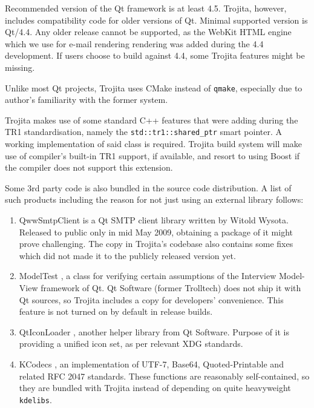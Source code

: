 \documentclass[12pt,notitlepage]{report}
\newcommand{\trojita}{Trojita\xspace}
\begin{document}
Recommended version of the Qt framework \cite{qt} is at least 4.5. \trojita,
however, includes compatibility code for older versions of Qt. Minimal supported
version is Qt/4.4. Any older release cannot be supported, as the WebKit HTML
engine which we use for e-mail rendering rendering was added during the 4.4
development. If users choose to build against 4.4, some \trojita features might
be missing.

Unlike most Qt projects, \trojita uses CMake \cite{cmake} instead of {\tt qmake},
especially due to author's familiarity with the former system.

\trojita makes use of some standard C++ features that were adding during the TR1
\cite{std-tr1} standardisation, namely the {\tt std::tr1::shared\_ptr} smart
pointer. A working implementation of said class is required.  \trojita build
system will make use of compiler's built-in TR1 support, if available, and
resort to using Boost if the compiler does not support this extension.

Some 3rd party code is also bundled in the source code distribution.  A list of
such products including the reason for not just using an external library
follows:

\begin{enumerate}
    \item{QwwSmtpClient \cite{qwwsmtpclient} is a Qt SMTP client library written
        by Witold Wysota.  Released to public only in mid May 2009, obtaining a
        package of it might prove challenging.  The copy in \trojita's codebase
        also contains some fixes which did not made it to the publicly released
        version yet.}
    \item{ModelTest \cite{modeltest}, a class for verifying certain assumptions
        of the Interview Model-View framework of Qt.  Qt Software (former
        Trolltech) does not ship it with Qt sources, so \trojita includes a copy
        for developers' convenience.  This feature is not turned on by default
        in release builds.}
    \item{QtIconLoader \cite{qticonloader}, another helper library from Qt
        Software.  Purpose of it is providing a unified icon set, as per
        relevant XDG standards.}
    \item{KCodecs \cite{kcodecs}, an implementation of UTF-7, Base64,
        Quoted-Printable and related RFC 2047 standards.  These functions are
        reasonably self-contained, so they are bundled with \trojita instead of
        depending on quite heavyweight {\tt kdelibs}.}
\end{enumerate}
\end{document}
